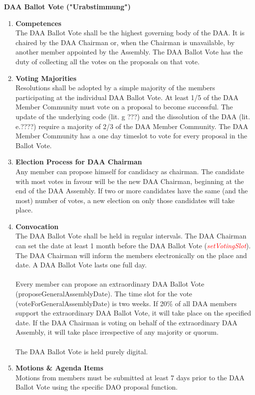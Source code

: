 \item \textbf{DAA Ballot Vote ("Urabstimmung")} \\
\begin{enumerate}[label=\textbf{\arabic*.}]
    \item \textbf{Competences} \\
    The DAA Ballot Vote shall be the highest governing body of the DAA.
    It is chaired by the DAA Chairman or, when the Chairman is unavailable, by another member appointed by the Assembly.
    The DAA Ballot Vote has the duty of collecting all the votes on the proposals on that vote.

    \item \textbf{Voting Majorities} \\
    Resolutions shall be adopted by a simple majority of the members participating at the individual DAA Ballot Vote.
    At least 1/5 of the DAA Member Community must vote on a proposal to become successful.
    The update of the underlying code (lit. g ???) and the dissolution of the DAA (lit. e.????) require a majority of 2/3 of the DAA Member Community. %
    The DAA Member Community has a one day timeslot to vote for every proposal in the Ballot Vote.

    \item \textbf{Election Process for DAA Chairman} \\
    Any member can propose himself for candidacy as chairman.
    The candidate with most votes in favour will be the new DAA Chairman, beginning at the end of the DAA Assembly.
    If two or more candidates have the same (and the most) number of votes, a new election on only those candidates will take place.

    \item \textbf{Convocation} \\
    The DAA Ballot Vote shall be held in regular intervals.
    The DAA Chairman can set the date at least 1 month before the DAA Ballot Vote (\textcolor{red}{\emph{setVotingSlot}}).
    The DAA Chairman will inform the members electronically on the place and date.
    A DAA Ballot Vote lasts one full day. \\ \\

    Every member can propose an extraordinary DAA Ballot Vote (proposeGeneralAssemblyDate). %
    The time slot for the vote (voteForGeneralAssemblyDate) is two weeks.
    If 20\% of all DAA members support the extraordinary DAA Ballot Vote, it will take place on the specified date.
    If the DAA Chairman is voting on behalf of the extraordinary DAA Assembly, it will take place irrespective of any majority or quorum. \\ \\
    The DAA Ballot Vote is held purely digital.

    \item \textbf{Motions \& Agenda Items} \\
    Motions from members must be submitted at least 7 days prior to the DAA Ballot Vote using the specific DAO proposal function.
\end{enumerate}


